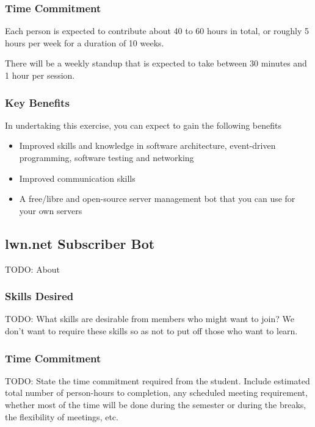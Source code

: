 \documentclass[11pt,fleqn]{article}
\begin{document}
\subsubsection*{Time Commitment}

Each person is expected to contribute about 40 to 60 hours in total, or roughly 5 hours per week for a duration of 10 weeks.

There will be a weekly standup that is expected to take between 30 minutes and 1 hour per session.

\subsubsection*{Key Benefits}

In undertaking this exercise, you can expect to gain the following benefits

\begin{itemize}
    \item Improved skills and knowledge in software architecture, event-driven programming, software testing and networking
    \item Improved communication skills
    \item A free/libre and open-source server management bot that you can use for your own servers
\end{itemize}

\newpage

\subsection{lwn.net Subscriber Bot}

TODO: About

\subsubsection*{Skills Desired}

TODO: What skills are desirable from members who might want to join?  We don't want to require these skills so as not to put off those who want to learn.

\subsubsection*{Time Commitment}

TODO: State the time commitment required from the student.  Include estimated total number of person-hours to completion, any scheduled meeting requirement, whether most of the time will be done during the semester or during the breaks, the flexibility of meetings, etc.
\end{document}
